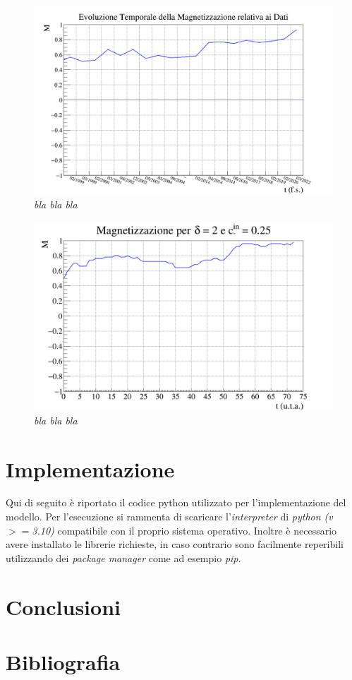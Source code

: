 \documentclass{article}
\begin{document}
\begin{figure}[h]
\centering
\includegraphics[width = 1.1\linewidth]{poland_magnetization_graph.png}
\caption{\textit{bla bla bla}}
\label{Fig:9}
\end{figure}

\begin{figure}[h]
\centering
\includegraphics[width = 1.1\linewidth]{poland_sim_magnetization_graph.png}
\caption{\textit{bla bla bla}}
\label{Fig:9}
\end{figure}

\section{Implementazione}
\label{Sec:5}
Qui di seguito è riportato il codice python utilizzato per l'implementazione del modello. Per l'esecuzione si rammenta di scaricare l'\textit{interpreter} di \textit{python (v ${>=}$3.10)} compatibile con il proprio sistema operativo. Inoltre è necessario avere installato le librerie richieste, in caso contrario sono facilmente reperibili utilizzando dei \textit{package manager} come ad esempio \textit{pip}.

\section{Conclusioni}
\label{Sec:6}

\section{Bibliografia}
\label{Sec:7}
\end{document}
